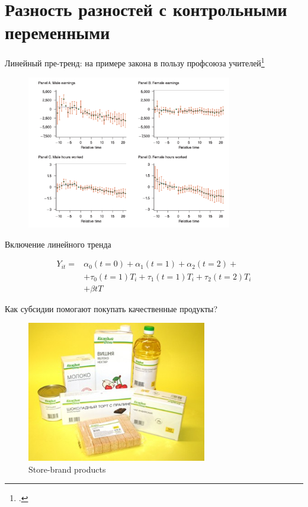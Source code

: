 \section{Разность разностей с контрольными переменными}

\begin{frame}{Линейный пре-тренд: на примере закона в пользу профсоюза учителей\footcite{lovenheim2019long}}

\begin{figure}
    \centering
    \includegraphics[width=0.8\textwidth]{Images/linear_trends.png}
\end{figure}

\end{frame}
\begin{frame}{Включение линейного тренда}

\begin{align*}
    Y_{it} = & \alpha_0 (t=0) + \alpha_1  (t=1) + \alpha_2 (t=2) + \\
     &+ \tau_0 (t=1) T_{i} + \tau_1 (t=1) T_{i} + \tau_2 (t=2) T_{i} \\
     &+ \beta tT
\end{align*}

\end{frame}

\begin{frame}{Как субсидии помогают покупать качественные продукты?}

\begin{figure}
    \centering
    \includegraphics[width=0.7\textwidth]{Images/brand-auchan13.jpg}
    \caption{Store-brand products}
\end{figure}


\end{frame}


